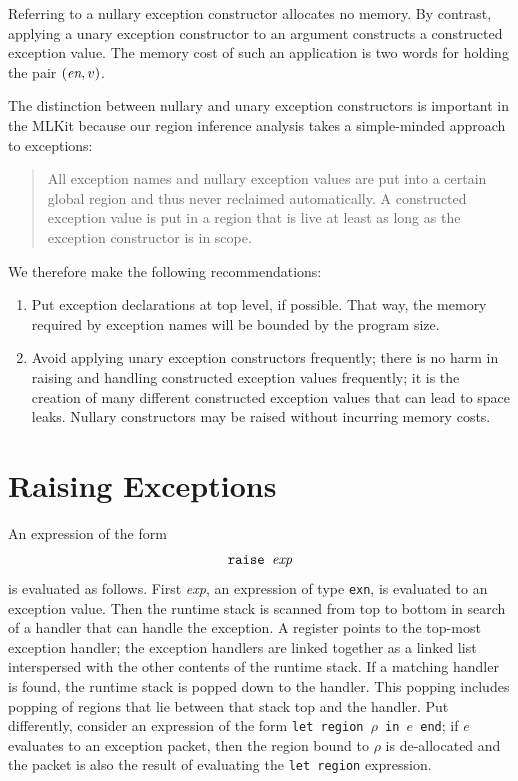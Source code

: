 \documentclass[12pt]{book}
\begin{document}
Referring to a nullary exception constructor allocates no memory. By
contrast, applying a unary exception constructor to an argument
constructs a constructed exception value. The memory cost of such an
application is two words for holding the pair $(\hbox{\it en}, v)$.

The distinction between nullary and unary exception constructors is
important in the MLKit because our region inference analysis takes a
simple-minded approach to exceptions:
\begin{quote}
  All exception names and nullary exception values are put into a
  certain
  global region and thus never reclaimed automatically. A constructed
  exception value is put in a region that is live at least as long as
  the exception constructor is in scope.
\end{quote}
We therefore make the following recommendations:
\begin{enumerate}
\item Put exception declarations at top level, if possible.  That way,
  the memory required by exception names will be bounded by the
  program size.
\item Avoid applying unary exception constructors frequently; there is
  no harm in raising and handling constructed exception values
  frequently; it is the creation of many different constructed
  exception values that can lead to space leaks. Nullary constructors
  may be raised without incurring memory costs.
\end{enumerate}

\section{Raising Exceptions}
An expression of the form
%
$$\hbox{\tt raise {\it exp}}$$
is evaluated as follows. First {\it exp},
an expression of type {\tt exn}, is evaluated to an exception value.
Then the runtime
%
stack is scanned from top to bottom in search of a handler that
can handle the exception. A register points to the top-most exception
handler; the exception handlers are linked together as a linked list
interspersed with the other contents of the runtime stack.  If a
matching handler is found, the runtime stack is popped down to the
handler. This popping includes popping of regions that lie between
that stack top and the handler. Put differently, consider an
expression of the form
%
{\tt let region $\rho$ in $e$ end}; if $e$ evaluates to an exception
packet, then the region bound to $\rho$ is de-allocated and the packet
is also the result of evaluating the \texttt{let region} expression.
\end{document}
